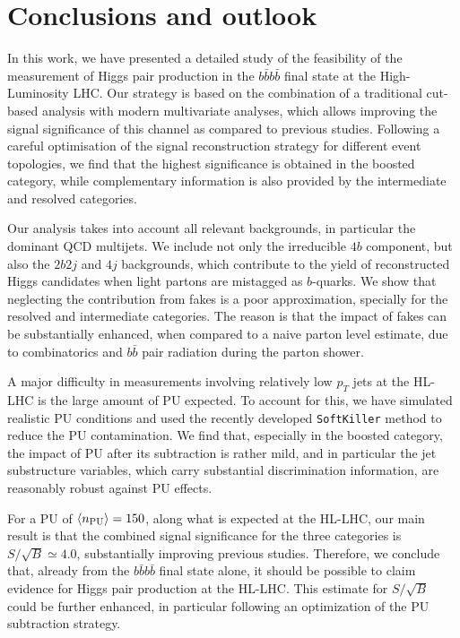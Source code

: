 \section{Conclusions and outlook}
\label{sec:conclusions}

In this work, we have presented a detailed study of the feasibility
of the measurement of Higgs pair production in the $b\bar{b}b\bar{b}$
final state at the High-Luminosity LHC.
%
Our strategy is based on the combination of a traditional
cut-based analysis with modern multivariate analyses,
which allows improving the signal significance of this channel
as compared to previous studies.
%
Following a careful optimisation of the
signal reconstruction strategy for different event topologies,
we find that the highest significance is obtained
in the 
boosted category, while complementary information is also provided
by the intermediate and resolved categories.
%

Our analysis takes into account 
all relevant backgrounds, in particular
the dominant QCD multijets.
%
We include not only the irreducible $4b$ component, but
also the $2b2j$ and $4j$ backgrounds, which contribute
to the yield of reconstructed Higgs candidates
when light partons are mistagged as $b$-quarks.
%
We show that neglecting the contribution
from  fakes is a poor approximation, specially for the resolved and intermediate
categories.
%
The reason is that
the impact of fakes
can be substantially enhanced, when compared to a naive parton
level estimate, due to combinatorics and $b\bar{b}$
pair radiation during the parton shower.

A major difficulty in measurements involving relatively low $p_T$
jets at the HL-LHC is the large
amount of PU expected.
%
To account for this, we have simulated realistic PU conditions
and used the recently developed {\tt SoftKiller} method to reduce
the PU contamination.
%
We find that, especially in the boosted category, the impact of
PU after its subtraction is rather mild, and in particular the jet
substructure variables, which carry substantial
discrimination information, are reasonably robust against PU effects.


For a PU of $\left\langle n_{\rm PU}\right\rangle=150$, along what is expected
at the HL-LHC, our main result is that the combined
signal significance for the three categories is $S/\sqrt{B}\simeq 4.0$,
substantially improving previous studies.
%
Therefore, we conclude that, already from the $b\bar{b}b\bar{b}$
final state alone,
it should be possible to claim evidence for Higgs pair production at
the HL-LHC.
%
This  estimate for $S/\sqrt{B}$  could
be further enhanced,
in particular following an optimization of the PU subtraction
strategy.


